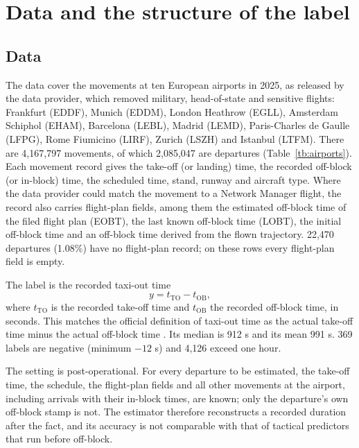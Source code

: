 \documentclass[
  manuscript=article,  %
  layout=preprint,  %
  year=20xx,
  volume=x,
]{extra/joas}
\begin{document}
\section{Data and the structure of the label}
\label{sec:data}

\subsection{Data}

The data cover the movements at ten European airports in 2025, as released by the data provider, which removed military, head-of-state and sensitive flights: Frankfurt (EDDF), Munich (EDDM), London Heathrow (EGLL), Amsterdam Schiphol (EHAM), Barcelona (LEBL), Madrid (LEMD), Paris-Charles de Gaulle (LFPG), Rome Fiumicino (LIRF), Zurich (LSZH) and Istanbul (LTFM). There are 4,167,797 movements, of which 2,085,047 are departures (Table~\ref{tb:airports}). Each movement record gives the take-off (or landing) time, the recorded off-block (or in-block) time, the scheduled time, stand, runway and aircraft type. Where the data provider could match the movement to a Network Manager flight, the record also carries flight-plan fields, among them the estimated off-block time of the filed flight plan (EOBT), the last known off-block time (LOBT), the initial off-block time and an off-block time derived from the flown trajectory. 22,470 departures (1.08\%) have no flight-plan record; on these rows every flight-plan field is empty.

The label is the recorded taxi-out time
\begin{equation}
y = t_{\mathrm{TO}} - t_{\mathrm{OB}},
\label{eq:label}
\end{equation}
where $t_{\mathrm{TO}}$ is the recorded take-off time and $t_{\mathrm{OB}}$ the recorded off-block time, in seconds. This matches the official definition of taxi-out time as the actual take-off time minus the actual off-block time \cite{eurocontrol2023additional,eurocontrol2017airport}. Its median is 912 s and its mean 991 s. 369 labels are negative (minimum $-12$ s) and 4,126 exceed one hour.

The setting is post-operational. For every departure to be estimated, the take-off time, the schedule, the flight-plan fields and all other movements at the airport, including arrivals with their in-block times, are known; only the departure's own off-block stamp is not. The estimator therefore reconstructs a recorded duration after the fact, and its accuracy is not comparable with that of tactical predictors that run before off-block.
\end{document}
